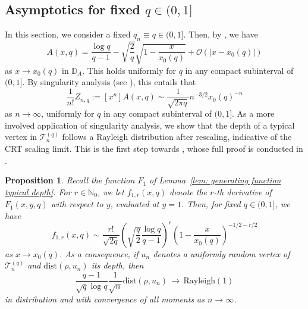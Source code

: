 \documentclass{article}
\newtheorem{proposition}[theorem]{Proposition}
\theoremstyle{remark}
\newcommand{\bN}{\mathbb{N}}
\newcommand{\cO}{\mathcal{O}}
\newcommand{\cv}[1]{\,\underset{#1}{\longrightarrow}\,}
\newcommand{\abs}[1]{{\left|#1\right|}}
\newcommand{\dist}{\mathrm{dist}}
\newcommand{\bD}{\mathbb{D}}
\newcommand{\cT}{\mathcal{T}}
\begin{document}
\subsection{Asymptotics for fixed $q\in(0,1]$}
\label{sec: Asymptotics for fixed q}

In this section, we consider a fixed $q_n \equiv q \in (0,1]$.
Then, by \cite[Lemma~21]{Thevenin_Wagner_2023}, we have
\begin{equation}\label{eq: asymptotic A close to singularity for fixed q}
    A(x,q) = \frac{\log q}{q-1} - \sqrt{\frac{2}{q}} \sqrt{1 - \frac{x}{x_0(q)}} + \cO(\abs{x-x_0(q)})
\end{equation}
as $x\to x_0(q)$ in $\bD_A$.
This holds uniformly for $q$ in any compact subinterval of $(0,1]$.
By singularity analysis (see \cite[Theorem VI.4]{Flajolet_Sedgewick_2009}), this entails that
\begin{equation}\label{eq: asymptotic coefficient A for fixed q}
    \frac{1}{n!} Z_{n,q} := [x^n] A(x,q) \sim \frac{1}{\sqrt{2\pi q}} n^{-3/2} x_0(q)^{-n}
\end{equation}
as $n\to\infty$, uniformly for $q$ in any compact subinterval of $(0,1]$.
As a more involved application of singularity analysis, we show that the depth of a typical vertex in $\cT_n^{(q)}$ follows a Rayleigh distribution after rescaling, indicative of the CRT scaling limit.
This is the first step towards , whose full proof is conducted in .

\begin{proposition}\label{prop: Rayleigh limit of typical depth when q fixed}
    Recall the function $F_1$ of Lemma~\ref{lem: generating function typical depth}.
    For $r\in\bN_0$, we let $f_{1,r}(x,q)$ denote the $r$-th derivative of $F_1(x,y,q)$ with respect to $y$, evaluated at $y=1$.
    Then, for fixed $q\in(0,1]$, we have
    \begin{equation}\label{eq: claim singularity f1r}
        f_{1,r}(x,q) \sim \frac{r!}{\sqrt{2q}} \left( \sqrt{\frac{q}{2}} \frac{\log q}{q-1} \right)^r \left( 1 - \frac{x}{x_0(q)} \right)^{-1/2-r/2}
    \end{equation}
    as $x\to x_0(q)$.
    As a consequence, if $u_n$ denotes a uniformly random vertex of $\cT_n^{(q)}$ and $\dist(\rho,u_n)$ its depth, then
    \begin{equation*}
        \frac{q-1}{\sqrt{q} \log q} \frac{1}{\sqrt n} \dist(\rho,u_n) 
        \cv{} \mathrm{Rayleigh}(1)
    \end{equation*}
    in distribution and with convergence of all moments as $n\to\infty$.
\end{proposition}
\end{document}
